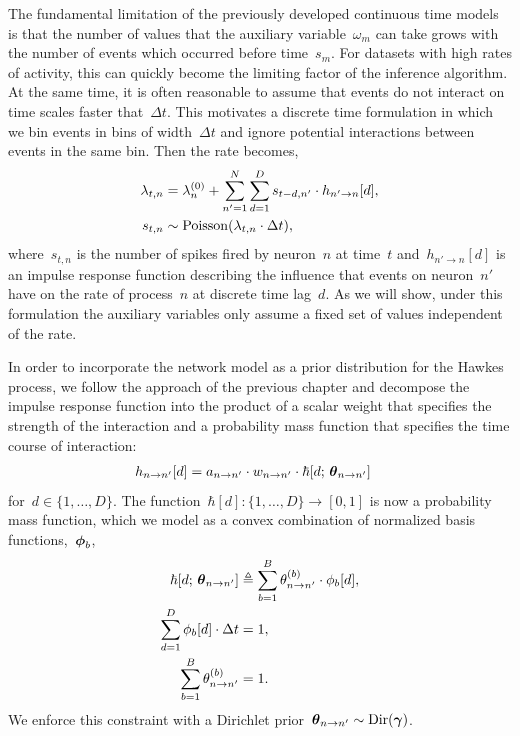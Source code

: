 The fundamental limitation of the previously developed continuous time
models is that the number of values that the auxiliary
variable~$\omega_m$ can take grows with the number of events which
occurred before time~$s_{m}$. For datasets with high rates of
activity, this can quickly become the limiting factor of the inference
algorithm.  At the same time, it is often reasonable to assume that
events do not interact on time scales faster that~$\Delta t$. This
motivates a discrete time formulation in which we bin events in bins
of width~$\Delta t$ and ignore potential interactions between events
in the same bin. Then the rate becomes,
\begin{align}
\label{eq:disc_hawkes_rate}
\lambda_{t,n} &= \lambda_n^{(0)} +
\sum_{n' = 1}^N \sum_{d=1}^{D} s_{t-d,n'} \cdot h_{n' \to n}[d], \\
s_{t,n} &\sim \mathrm{Poisson}(\lambda_{t,n} \cdot \Delta t),
\end{align}
where~$s_{t,n}$ is the number of spikes fired by neuron~$n$ at time~$t$
and~${h_{n' \to n}[d]}$ is an impulse response function describing
the influence that events on neuron~$n'$ have on the
rate of process~$n$ at discrete time lag~${d}$. As we will show,
under this formulation the auxiliary variables only assume a fixed set
of values independent of the rate.

In order to incorporate the network model as a prior distribution for
the Hawkes process, we follow the approach of the previous chapter
and decompose the impulse response function into the product of a
scalar weight that specifies the strength of the interaction and a
probability mass function that specifies the time course of
interaction:
\begin{align*}
  h_{n \to n'}[d]
  &= a_{n \to n'} \cdot w_{n \to n'} \cdot \hbar[d; \, \boldsymbol{\theta}_{n \to n'}] 
\end{align*}
for~${d \in\{1,\ldots,D\}}$.  
The function~${\hbar[d]: \{1, \ldots, D\} \to
  [0,1]}$ is now a probability mass function, which we model as a convex
combination of normalized basis functions,~$\boldsymbol{\phi}_b$,
\begin{align*}
  \hbar[d; \, \boldsymbol{\theta}_{n \to n'}]
  &\triangleq \sum_{b=1}^B \theta_{n \to n'}^{(b)} \cdot \phi_b[d], \\
  \sum_{d=1}^D \phi_b[d] \cdot \Delta t  &= 1, \\
  \sum_{b=1}^B \theta_{n \to n'}^{(b)} &= 1.
\end{align*}
We enforce this constraint with a Dirichlet
prior~${\boldsymbol{\theta}_{n \to n'} \sim \mathrm{Dir}(\boldsymbol{\gamma})}$.

